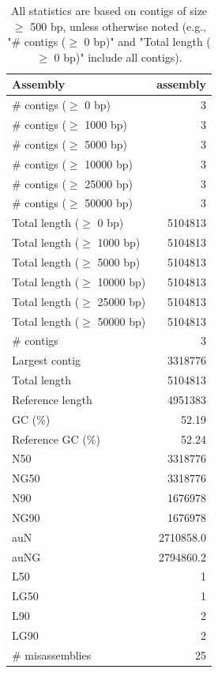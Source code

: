 \documentclass[12pt,a4paper]{article}
\begin{document}
\begin{table}[ht]
\begin{center}
\caption{All statistics are based on contigs of size $\geq$ 500 bp, unless otherwise noted (e.g., "\# contigs ($\geq$ 0 bp)" and "Total length ($\geq$ 0 bp)" include all contigs).}
\begin{tabular}{|l*{1}{|r}|}
\hline
Assembly & assembly \\ \hline
\# contigs ($\geq$ 0 bp) & 3 \\ \hline
\# contigs ($\geq$ 1000 bp) & 3 \\ \hline
\# contigs ($\geq$ 5000 bp) & 3 \\ \hline
\# contigs ($\geq$ 10000 bp) & 3 \\ \hline
\# contigs ($\geq$ 25000 bp) & 3 \\ \hline
\# contigs ($\geq$ 50000 bp) & 3 \\ \hline
Total length ($\geq$ 0 bp) & 5104813 \\ \hline
Total length ($\geq$ 1000 bp) & 5104813 \\ \hline
Total length ($\geq$ 5000 bp) & 5104813 \\ \hline
Total length ($\geq$ 10000 bp) & 5104813 \\ \hline
Total length ($\geq$ 25000 bp) & 5104813 \\ \hline
Total length ($\geq$ 50000 bp) & 5104813 \\ \hline
\# contigs & 3 \\ \hline
Largest contig & 3318776 \\ \hline
Total length & 5104813 \\ \hline
Reference length & 4951383 \\ \hline
GC (\%) & 52.19 \\ \hline
Reference GC (\%) & 52.24 \\ \hline
N50 & 3318776 \\ \hline
NG50 & 3318776 \\ \hline
N90 & 1676978 \\ \hline
NG90 & 1676978 \\ \hline
auN & 2710858.0 \\ \hline
auNG & 2794860.2 \\ \hline
L50 & 1 \\ \hline
LG50 & 1 \\ \hline
L90 & 2 \\ \hline
LG90 & 2 \\ \hline
\# misassemblies & 25 \\ \hline

\end{tabular}
\end{center}
\end{table}
\end{document}
